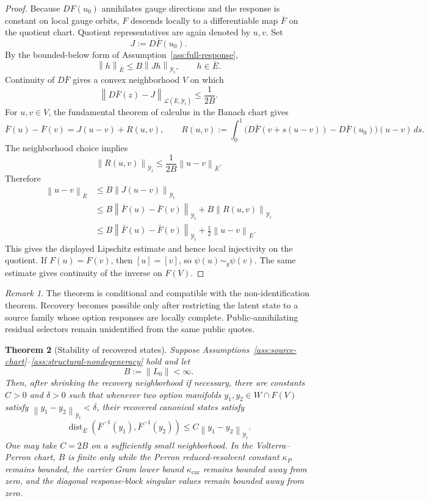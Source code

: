 \documentclass[11pt,a4paper]{amsart}
\theoremstyle{plain}
\newtheorem{theorem}{Theorem}[section]
\theoremstyle{definition}
\theoremstyle{remark}
\newtheorem{remark}[theorem]{Remark}
\DeclareMathOperator{\dist}{dist}
\newcommand{\cL}{\mathcal{L}}
\newcommand{\cY}{\mathcal{Y}}
\newcommand{\dd}{\,d}
\newcommand{\norm}[1]{\left\lVert #1\right\rVert}
\begin{document}
\begin{proof}
Because \(DF(u_0)\) annihilates gauge directions and the response is constant on local gauge
orbits, \(F\) descends locally to a differentiable map \(\bar F\) on the quotient chart.  Quotient
representatives are again denoted by \(u,v\).  Set
\[
        J:=D\bar F(u_0).
\]
By the bounded-below form of Assumption~\ref{ass:full-response},
\[
        \norm{h}_{\bar E}\le B\norm{Jh}_{\cY_t},\qquad h\in\bar E.
\]
Continuity of \(D\bar F\) gives a convex neighborhood \(V\) on which
\[
        \norm{D\bar F(z)-J}_{\cL(\bar E,\cY_t)}
        \le \frac{1}{2B}.
\]
For \(u,v\in V\), the fundamental theorem of calculus in the Banach chart gives
\[
        \bar F(u)-\bar F(v)
        =
        J(u-v)
        +
        R(u,v),
        \qquad
        R(u,v):=\int_0^1
        \bigl(D\bar F(v+s(u-v))-D\bar F(u_0)\bigr)(u-v)\dd s .
\]
The neighborhood choice implies
\[
        \norm{R(u,v)}_{\cY_t}\le \frac{1}{2B}\norm{u-v}_{\bar E}.
\]
Therefore
\begin{align*}
        \norm{u-v}_{\bar E}
        &\le
        B\norm{J(u-v)}_{\cY_t}  \\
        &\le
        B\norm{\bar F(u)-\bar F(v)}_{\cY_t}
        +B\norm{R(u,v)}_{\cY_t}  \\
        &\le
        B\norm{\bar F(u)-\bar F(v)}_{\cY_t}
        +\frac12\norm{u-v}_{\bar E}.
\end{align*}
This gives the displayed Lipschitz estimate and hence local injectivity on the quotient.  If
\(F(u)=F(v)\), then \([u]=[v]\), so \(\psi(u)\sim_g\psi(v)\).  The same estimate gives continuity
of the inverse on \(F(V)\).
\end{proof}

\begin{remark}
The theorem is conditional and compatible with the non-identification theorem.  Recovery becomes
possible only after restricting the latent state to a source family whose option responses are
locally complete.  Public-annihilating residual selectors remain unidentified from the same public
quotes.
\end{remark}

\begin{theorem}[Stability of recovered states]\label{thm:recovery-stability}
Suppose Assumptions~\ref{ass:source-chart}--\ref{ass:structural-nondegeneracy} hold and let
\[
        B:=\norm{L_0}<\infty.
\]
Then, after shrinking the recovery neighborhood if necessary, there are constants \(C>0\) and
\(\delta>0\) such that whenever two option manifolds \(y_1,y_2\in W\cap F(V)\) satisfy
\(\norm{y_1-y_2}_{\cY_t}<\delta\), their recovered canonical states satisfy
\[
        \dist_{\bar E}\!\left(\bar F^{-1}(y_1),\bar F^{-1}(y_2)\right)
        \le C\norm{y_1-y_2}_{\cY_t}.
\]
One may take \(C=2B\) on a sufficiently small neighborhood.  In the Volterra--Perron chart,
\(B\) is finite only while the Perron reduced-resolvent constant \(\kappa_P\) remains bounded,
the carrier Gram lower bound \(\kappa_{\mathrm{car}}\) remains bounded away from zero, and the
diagonal response-block singular values remain bounded away from zero.
\end{theorem}
\end{document}
